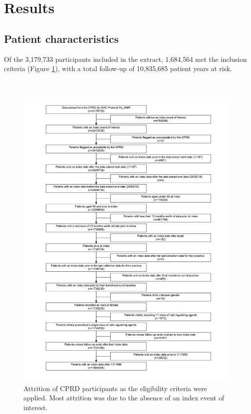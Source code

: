 \documentclass[a4paper, twoside]{templates/ociamthesis}
\begin{document}
\hypertarget{results-1}{%
\section{Results}\label{results-1}}

\hypertarget{patient-characteristics}{%
\subsection{Patient characteristics}\label{patient-characteristics}}

Of the 3,179,733 participants included in the extract, 1,684,564 met the inclusion criteria (Figure \ref{fig:cprdFlowchart}), with a total follow-up of 10,835,685 patient years at risk.

~





\begin{figure}[H]
\includegraphics[width=1\linewidth]{figures/cprd-analysis/cohort_attrition} \caption[Attrition of CPRD participants]{Attrition of CPRD participants as the eligibility criteria were applied. Most attrition was due to the absence of an index event of interest.}\label{fig:cprdFlowchart}
\end{figure}
\end{document}
